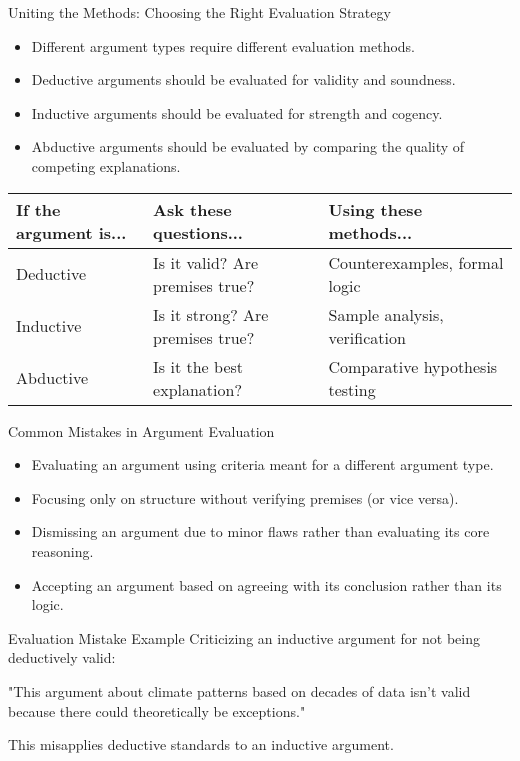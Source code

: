 \documentclass{beamer}
\begin{document}
\begin{frame}{Uniting the Methods: Choosing the Right Evaluation Strategy}
    \begin{itemize}
        \item Different argument types require different evaluation methods.
        \item Deductive arguments should be evaluated for validity and soundness.
        \item Inductive arguments should be evaluated for strength and cogency.
        \item Abductive arguments should be evaluated by comparing the quality of competing explanations.
    \end{itemize}
    
    \begin{table}
        \scriptsize
        \centering
        \begin{tabular}{|l|l|l|}
            \hline
            \textbf{If the argument is...} & \textbf{Ask these questions...} & \textbf{Using these methods...} \\
            \hline
            Deductive & Is it valid? Are premises true? & Counterexamples, formal logic \\
            \hline
            Inductive & Is it strong? Are premises true? & Sample analysis, verification \\
            \hline
            Abductive & Is it the best explanation? & Comparative hypothesis testing \\
            \hline
        \end{tabular}
    \end{table}
\end{frame}

\begin{frame}{Common Mistakes in Argument Evaluation}
    \begin{itemize}
        \item Evaluating an argument using criteria meant for a different argument type.
        \item Focusing only on structure without verifying premises (or vice versa).
        \item Dismissing an argument due to minor flaws rather than evaluating its core reasoning.
        \item Accepting an argument based on agreeing with its conclusion rather than its logic.
    \end{itemize}
    
    \begin{exampleblock}{Evaluation Mistake Example}
        Criticizing an inductive argument for not being deductively valid:
        
        "This argument about climate patterns based on decades of data isn't valid because there could theoretically be exceptions."
        
        This misapplies deductive standards to an inductive argument.
    \end{exampleblock}
\end{frame}
\end{document}
